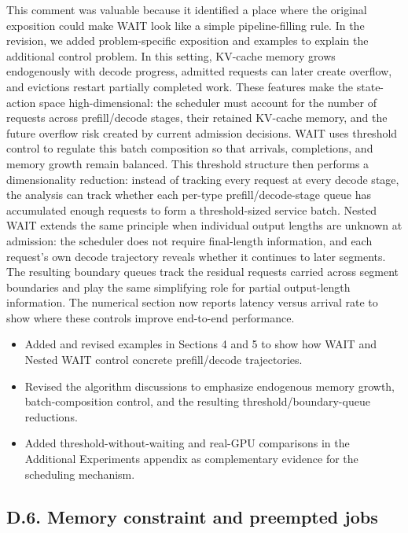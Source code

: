 \response This comment was valuable because it identified a place where the original exposition could make WAIT look like a simple pipeline-filling rule. In the revision, we added problem-specific exposition and examples to explain the additional control problem. In this setting, KV-cache memory grows endogenously with decode progress, admitted requests can later create overflow, and evictions restart partially completed work. These features make the state-action space high-dimensional: the scheduler must account for the number of requests across prefill/decode stages, their retained KV-cache memory, and the future overflow risk created by current admission decisions. WAIT uses threshold control to regulate this batch composition so that arrivals, completions, and memory growth remain balanced. This threshold structure then performs a dimensionality reduction: instead of tracking every request at every decode stage, the analysis can track whether each per-type prefill/decode-stage queue has accumulated enough requests to form a threshold-sized service batch. Nested WAIT extends the same principle when individual output lengths are unknown at admission: the scheduler does not require final-length information, and each request's own decode trajectory reveals whether it continues to later segments. The resulting boundary queues track the residual requests carried across segment boundaries and play the same simplifying role for partial output-length information. The numerical section now reports latency versus arrival rate to show where these controls improve end-to-end performance.

\changes
\begin{itemize}
    \item Added and revised examples in Sections 4 and 5 to show how WAIT and Nested WAIT control concrete prefill/decode trajectories.
    \item Revised the algorithm discussions to emphasize endogenous memory growth, batch-composition control, and the resulting threshold/boundary-queue reductions.
    \item Added threshold-without-waiting and real-GPU comparisons in the Additional Experiments appendix as complementary evidence for the scheduling mechanism.
\end{itemize}

\subsection*{D.6. Memory constraint and preempted jobs}


